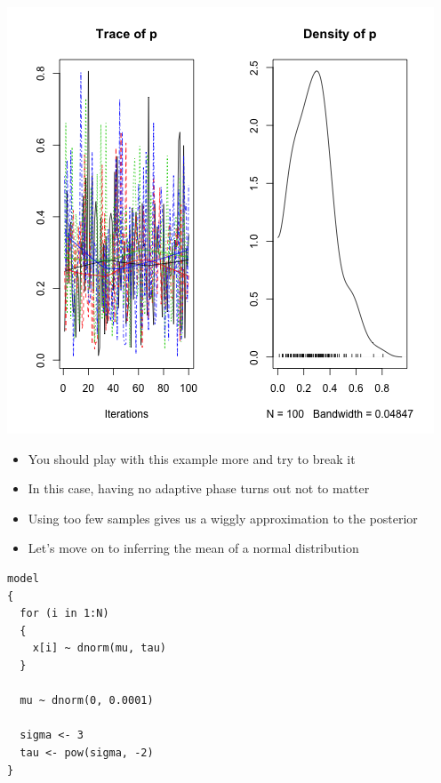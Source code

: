 \documentclass{beamer}
\begin{document}
\begin{frame}[fragile]
  \begin{center}
    \includegraphics[scale = 0.4]{../graphs/binomial/broken_plot.png}
  \end{center}
\end{frame}

\begin{frame}[fragile]
  \begin{itemize}
    \item{You should play with this example more and try to break it}
    \item{In this case, having no adaptive phase turns out not to matter}
    \item{Using too few samples gives us a wiggly approximation to the posterior}
  \end{itemize}
\end{frame}

\begin{frame}[fragile]
  \begin{itemize}
    \item{Let's move on to inferring the mean of a normal distribution}
  \end{itemize}
\end{frame}

\begin{frame}[fragile]
  \begin{verbatim}
model
{
  for (i in 1:N)
  {
    x[i] ~ dnorm(mu, tau)
  }
  
  mu ~ dnorm(0, 0.0001)
  
  sigma <- 3
  tau <- pow(sigma, -2)
}
  \end{verbatim}
\end{frame}
\end{document}
